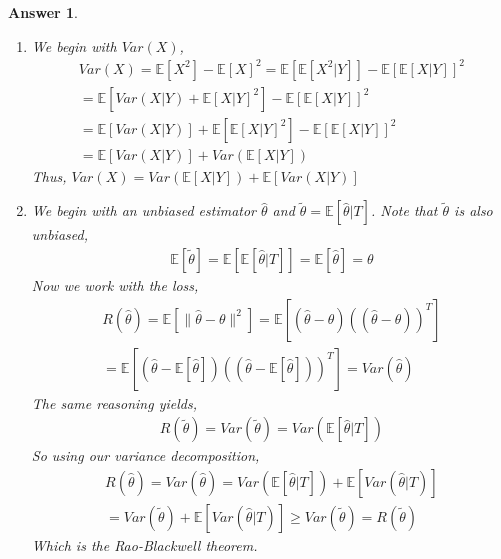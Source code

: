 \documentclass[12pt]{article}
\theoremstyle{colon}
\newtheorem*{answer}{Answer}
\begin{document}
\begin{answer}
  \leavevmode
  \begin{enumerate}[label=\arabic*)]
    \item We begin with $Var(X)$,
      \begin{gather*}
        Var(X) = \mathbb{E}[X^2] - \mathbb{E}[X]^2 = \mathbb{E}[\mathbb{E}[X^2|Y]] - \mathbb{E}[\mathbb{E}[X|Y]]^2 \\
        = \mathbb{E}[Var(X|Y) + \mathbb{E}[X|Y]^2] - \mathbb{E}[\mathbb{E}[X|Y]]^2 \\
        = \mathbb{E}[Var(X|Y)] + \mathbb{E}[\mathbb{E}[X|Y]^2] - \mathbb{E}[\mathbb{E}[X|Y]]^2 \\
        = \mathbb{E}[Var(X|Y)] + Var(\mathbb{E}[X|Y])
      \end{gather*}
      Thus, $Var(X) = Var(\mathbb{E}[X|Y]) + \mathbb{E}[Var(X|Y)]$
    \item We begin with an unbiased estimator $\widehat{\theta}$ and $\tilde{\theta} = \mathbb{E}[\widehat{\theta} | T]$. Note that $\tilde{\theta}$ is also unbiased,
      \begin{gather*}
        \mathbb{E}[\tilde{\theta}] = \mathbb{E}[\mathbb{E}[\widehat{\theta}|T]] = \mathbb{E}[\widehat{\theta}] = \theta
      \end{gather*}
      Now we work with the loss,
      \begin{gather*}
        R(\widehat{\theta}) = \mathbb{E}[\lVert \widehat{\theta} - \theta \rVert^2] = \mathbb{E}[(\widehat{\theta} - \theta)((\widehat{\theta} - \theta))^T] \\
        = \mathbb{E}[(\widehat{\theta} - \mathbb{E}[\widehat{\theta}])((\widehat{\theta} - \mathbb{E}[\widehat{\theta}]))^T] = Var(\widehat{\theta})
      \end{gather*}
      The same reasoning yields,
      \begin{gather*}
        R(\tilde{\theta}) = Var(\tilde{\theta}) = Var(\mathbb{E}[\widehat{\theta} | T])
      \end{gather*}
      So using our variance decomposition,
      \begin{gather*}
        R(\widehat{\theta}) = Var(\widehat{\theta}) = Var(\mathbb{E}[\widehat{\theta} | T]) + \mathbb{E}[Var(\widehat{\theta}|T)] \\
        = Var(\tilde{\theta}) + \mathbb{E}[Var(\widehat{\theta}|T)] \geq Var(\tilde{\theta}) = R(\tilde{\theta})
      \end{gather*}
      Which is the Rao-Blackwell theorem.
  \end{enumerate}
\end{answer}
\end{document}

